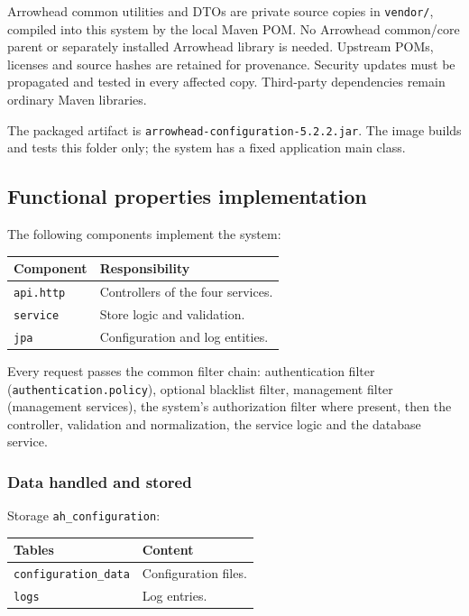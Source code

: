 \documentclass[a4paper]{arrowhead}
\begin{document}
Arrowhead common utilities and DTOs are private source copies in \texttt{vendor/}, compiled into this system by the local Maven POM. No Arrowhead common/core parent or separately installed Arrowhead library is needed. Upstream POMs, licenses and source hashes are retained for provenance. Security updates must be propagated and tested in every affected copy. Third-party dependencies remain ordinary Maven libraries.

The packaged artifact is \texttt{arrowhead-\allowbreak{}configuration-5.2.2.jar}. The image builds and tests this folder only; the system has a fixed application main class.

\subsection{Functional properties implementation}

The following components implement the system:

\noindent\begin{longtable}{| p{5.6cm} | p{9.6cm} |} \hline
\rowcolor{gray!33} Component & Responsibility \\ \hline \endhead
\texttt{api.\allowbreak{}http} & Controllers of the four services. \\ \hline
\texttt{service} & Store logic and validation. \\ \hline
\texttt{jpa} & Configuration and log entities. \\ \hline
\end{longtable}

Every request passes the common filter chain: authentication filter (\texttt{authentication.\allowbreak{}policy}), optional blacklist filter, management filter (management services), the system's authorization filter where present, then the controller, validation and normalization, the service logic and the database service.

\subsubsection{Data handled and stored}

Storage \texttt{ah\_\allowbreak{}configuration}:

\noindent\begin{longtable}{| p{6.4cm} | p{8.8cm} |} \hline
\rowcolor{gray!33} Tables & Content \\ \hline \endhead
\texttt{configuration\_\allowbreak{}data} & Configuration files. \\ \hline
\texttt{logs} & Log entries. \\ \hline
\end{longtable}
\end{document}
